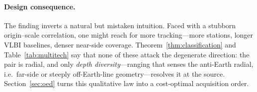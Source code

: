 \paragraph{Design consequence.}
The finding inverts a natural but mistaken intuition. Faced with a stubborn
origin--scale correlation, one might reach for more tracking---more stations,
longer VLBI baselines, denser near-side coverage. Theorem~\ref{thm:classification}
and Table~\ref{tab:multitech} say that none of these attack the degenerate
direction: the pair is radial, and only \emph{depth diversity}---ranging that
senses the anti-Earth radial, i.e.\ far-side or steeply off-Earth-line
geometry---resolves it at the source. Section~\ref{sec:oed} turns this qualitative
law into a cost-optimal acquisition order.
